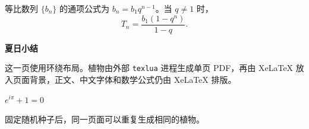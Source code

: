 \documentclass[11pt]{ctexart}
\begin{document}
等比数列 $\{b_n\}$ 的通项公式为 $b_n=b_1q^{n-1}$。当 $q\neq1$ 时，
\[
  T_n=\frac{b_1(1-q^n)}{1-q}.
\]

\newpage
\thispagestyle{empty}
\begin{center}
  {\Huge\bfseries 夏日小结\par}
\end{center}
\vspace{2em}

这一页使用环绕布局。植物由外部 \texttt{texlua} 进程生成单页 PDF，再由 XeLaTeX 放入页面背景，正文、中文字体和数学公式仍由 XeLaTeX 排版。

\begin{center}
\Large
$\displaystyle e^{i\pi}+1=0$
\end{center}

\vfill
\begin{center}
\small 固定随机种子后，同一页面可以重复生成相同的植物。
\end{center}
\end{document}
